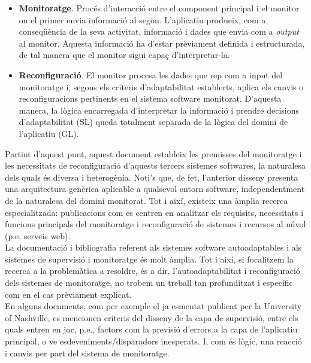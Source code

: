 \begin{itemize}
\item \textbf{Monitoratge}. Procés d'interacció entre el component principal i el monitor on el primer envia informació al segon. L'aplicatiu produeix, com a conseqüència de la seva activitat, informació i dades que envia com a \textit{output} al monitor. Aquesta informació ha d'estar prèviament definida i estructurada, de tal manera que el monitor sigui capaç d'interpretar-la.
\item \textbf{Reconfiguració}. El monitor procesa les dades que rep com a input del monitoratge i, segons els criteris d'adaptabilitat establerts, aplica els canvis o reconfiguracions pertinents en el sistema software monitorat. D'aquesta manera, la lògica encarregada d'interpretar la informació i prendre decisions d'adaptabilitat (SL) queda totalment separada de la lògica del domini de l'aplicatiu (GL).
\end{itemize}

Partint d'aquest punt, aquest document estableix les premisses del monitoratge i les necessitats de reconfiguració d’aquests tercers sistemes softwares, la naturalesa dels quals és diversa i heterogènia. Noti's que, de fet, l'anterior disseny presenta una arquitectura genèrica aplicable a qualsevol entorn software, independentment de la naturalesa del domini monitorat. Tot i així, existeix una àmplia recerca especialitzada: publicacions com \cite{napols} es centren en analitzar els requisits, necessitats i funcions principals del monitoratge i reconfiguració de sistemes i recursos al núvol (p.e. serveis web).\\

La documentació i bibliografia referent als sistemes software autoadaptables i als sistemes de supervisió i monitoratge és molt àmplia. Tot i així, si focalitzem la recerca a la problemàtica a resoldre, és a dir, l’autoadaptabilitat i reconfiguració dels sistemes de monitoratge, no trobem un treball tan profunditzat i específic com en el cas prèviament explicat.\\

En alguns documents, com per exemple el ja esmentat publicat per la University of Nashville, es mencionen criteris del disseny de la capa de supervisió, entre els quals entren en joc, p.e., factors com la previsió d’errors a la capa de l’aplicatiu principal, o ve esdeveniments/disparadors inesperats. I, com és lògic, una reacció i canvis per part del sistema de monitoratge. \\

